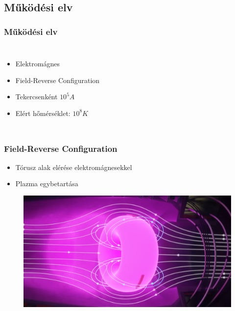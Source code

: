 \documentclass{beamer}
\begin{document}
\subsection{Működési elv}
\begin{frame}
    \frametitle{Működési elv}
    \begin{columns}
        \begin{itemize}
            \footnotesize
            \item Elektromágnes
            \item Field-Reverse Configuration
            \item Tekercsenként $10^5A$
            \item Elért hőmérséklet: $10^8K$
        \end{itemize}
    \end{columns}
\end{frame}
\begin{frame}
    \frametitle{Field-Reverse Configuration}
    \begin{itemize}
        \item Tórusz alak elérése elektromágnesekkel
        \item Plazma egybetartása
    \end{itemize}
    \begin{figure}
        \includegraphics[scale=0.15]{field_reverse_config.png}
    \end{figure}
\end{frame}
\end{document}
